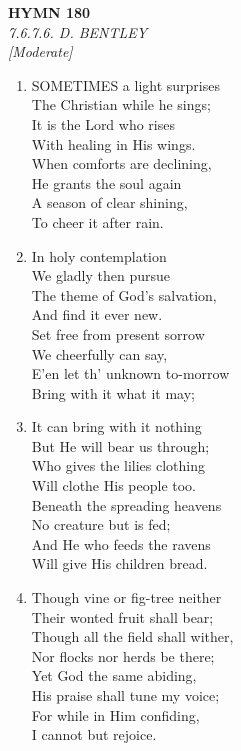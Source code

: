 \newpage
\begin{center}
    {\Large \textbf{HYMN 180}}
    \\
    \textit{7.6.7.6. D. BENTLEY}
    \\
    \textit{\small [Moderate]}
\end{center}
\vspace{1em}

\begin{enumerate}
    \item SOMETIMES a light surprises \\
        The Christian while he sings; \\
        It is the Lord who rises \\
        With healing in His wings. \\
        When comforts are declining, \\
        He grants the soul again \\
        A season of clear shining, \\
        To cheer it after rain.

    \item In holy contemplation \\
        We gladly then pursue \\
        The theme of God's salvation, \\
        And find it ever new. \\
        Set free from present sorrow \\
        We cheerfully can say, \\
        E'en let th' unknown to-morrow \\
        Bring with it what it may;

    \item It can bring with it nothing \\
        But He will bear us through; \\
        Who gives the lilies clothing \\
        Will clothe His people too. \\
        Beneath the spreading heavens \\
        No creature but is fed; \\
        And He who feeds the ravens \\
        Will give His children bread.

    \item Though vine or fig-tree neither \\
        Their wonted fruit shall bear; \\
        Though all the field shall wither, \\
        Nor flocks nor herds be there; \\
        Yet God the same abiding, \\
        His praise shall tune my voice; \\
        For while in Him confiding, \\
        I cannot but rejoice.

\end{enumerate}

